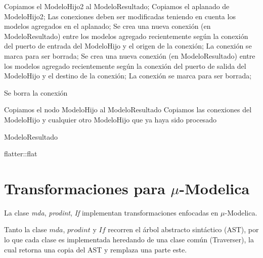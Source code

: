 \begin{algorithm}[H]
\begin{algorithmic}[1]
  			 		\State Copiamos el ModeloHijo2 al ModeloResultado;
				\Else
  			 		\State Copiamos el aplanado de ModeloHijo2;
				\EndIf
  			 			\State Las conexiones deben ser modificadas teniendo en cuenta los modelos agregados en el aplanado;
					\EndIf
  			 			\State Se crea una nueva conexión (en ModeloResultado) entre los modelos agregado recientemente según la conexión del puerto de entrada del ModeloHijo y el origen de la conexión;
  			 			\State La conexión se marca para ser borrada;
					\EndIf
  			 			\State Se crea una nueva conexión (en ModeloResultado) entre los modelos agregado recientemente según la conexión del puerto de salida del ModeloHijo y el destino de la conexión;
  			 			\State La conexión se marca para ser borrada;
					\EndIf
						
						\State Se borra la conexión
					\EndIf
				\EndFor
		\EndFor
  	\Else

  		\State Copiamos el nodo ModeloHijo al ModeloResultado 
  		\State Copiamos las conexiones del ModeloHijo y cualquier otro ModeloHijo que ya haya sido procesado

	\EndIf
\EndFor
\Return ModeloResultado
\end{algorithmic}
\caption{flatter::flat}
\end{algorithm}

 
\section{Transformaciones para $\mu$-Modelica}
	 La clase \emph{mda}, \emph{prodint}, \emph{If} implementan transformaciones enfocadas en $\mu$-Modelica.
	 
	Tanto la clase $mda$, $prodint$ y $If$ recorren el árbol abstracto sintáctico (AST), por lo que cada clase es implementada heredando de una clase común 
	(Traverser), la cual retorna una copia del AST y remplaza una parte este.
	 
